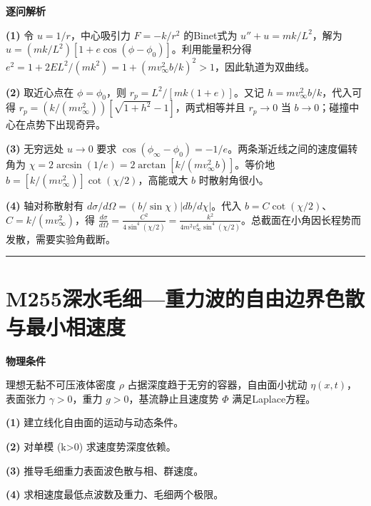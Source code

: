 \documentclass[UTF8,a4paper,11pt,oneside,openany]{ctexbook}
\begin{document}
\par\medskip\noindent\textbf{逐问解析}
\par\noindent\textbf{(1)} 令 \(u=1/r\)，中心吸引力 \(F=-k/r^2\) 的Binet式为 \(u''+u=mk/L^2\)，解为 \(u=(mk/L^2)[1+e\cos(\phi-\phi_0)]\)。利用能量积分得 \(e^2=1+2EL^2/(mk^2)=1+(mv_\infty^2b/k)^2>1\)，因此轨道为双曲线。
\par\noindent\textbf{(2)} 取近心点在 \(\phi=\phi_0\)，则 \(r_p=L^2/[mk(1+e)]\)。又记 \(h=mv_\infty^2b/k\)，代入可得 \(r_p=(k/(mv_\infty^2))[\sqrt{1+h^2}-1]\)，两式相等并且 \(r_p\to0\) 当 \(b\to0\)；碰撞中心在点势下出现奇异。
\par\noindent\textbf{(3)} 无穷远处 \(u\to0\) 要求 \(\cos(\phi_\infty-\phi_0)=-1/e\)。两条渐近线之间的速度偏转角为 \(\chi=2\arcsin(1/e)=2\arctan[k/(mv_\infty^2b)]\)。等价地 \(b=[k/(mv_\infty^2)]\cot(\chi/2)\)，高能或大 \(b\) 时散射角很小。
\par\noindent\textbf{(4)} 轴对称散射有 \(d\sigma/d\Omega=(b/\sin\chi)|db/d\chi|\)。代入 \(b=C\cot(\chi/2)\)、\(C=k/(mv_\infty^2)\)，得 \(\frac{d\sigma}{d\Omega}=\frac{C^2}{4\sin^4(\chi/2)}=\frac{k^2}{4m^2v_\infty^4\sin^4(\chi/2)}\)。总截面在小角因长程势而发散，需要实验角截断。

\par\bigskip\hrule\bigskip
\section*{M255\quad 深水毛细—重力波的自由边界色散与最小相速度}
\textbf{物理条件}\par 理想无黏不可压液体密度 \(\rho\) 占据深度趋于无穷的容器，自由面小扰动 \(\eta(x,t)\)，表面张力 \(\gamma>0\)，重力 \(g>0\)，基流静止且速度势 \(\Phi\) 满足Laplace方程。
\par\noindent\textbf{(1)} 建立线化自由面的运动与动态条件。
\par\noindent\textbf{(2)} 对单模 (k>0) 求速度势深度依赖。
\par\noindent\textbf{(3)} 推导毛细重力表面波色散与相、群速度。
\par\noindent\textbf{(4)} 求相速度最低点波数及重力、毛细两个极限。
\end{document}
